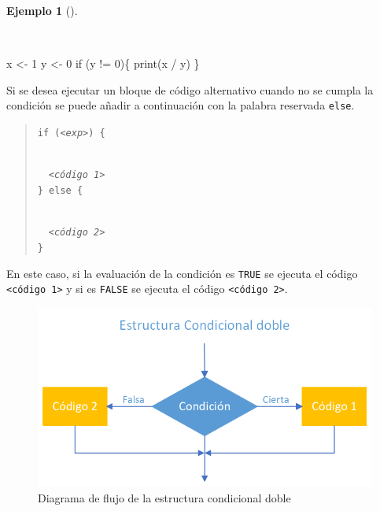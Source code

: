 \documentclass[
  a4paper,
]{scrreport}
\newenvironment{Shaded}{\begin{snugshade}}{\end{snugshade}}
\newcommand{\ControlFlowTok}[1]{\textcolor[rgb]{0.00,0.23,0.31}{#1}}
\newcommand{\DecValTok}[1]{\textcolor[rgb]{0.68,0.00,0.00}{#1}}
\newcommand{\FunctionTok}[1]{\textcolor[rgb]{0.28,0.35,0.67}{#1}}
\newcommand{\NormalTok}[1]{\textcolor[rgb]{0.00,0.23,0.31}{#1}}
\newcommand{\OtherTok}[1]{\textcolor[rgb]{0.00,0.23,0.31}{#1}}
\newcommand{\SpecialCharTok}[1]{\textcolor[rgb]{0.37,0.37,0.37}{#1}}
\theoremstyle{definition}
\theoremstyle{definition}
\newtheorem{example}{Ejemplo}[chapter]
\theoremstyle{remark}
\begin{document}
\begin{example}[]\protect\hypertarget{exm-condicional-simple}{}\label{exm-condicional-simple}

~

\begin{Shaded}
\begin{Highlighting}[]
\NormalTok{x }\OtherTok{\textless{}{-}} \DecValTok{1}
\NormalTok{y }\OtherTok{\textless{}{-}} \DecValTok{0}
\ControlFlowTok{if}\NormalTok{ (y }\SpecialCharTok{!=} \DecValTok{0}\NormalTok{)\{}
  \FunctionTok{print}\NormalTok{(x }\SpecialCharTok{/}\NormalTok{ y)}
\NormalTok{\}}
\end{Highlighting}
\end{Shaded}

\end{example}

Si se desea ejecutar un bloque de código alternativo cuando no se cumpla
la condición se puede añadir a continuación con la palabra reservada
\texttt{else}.

\begin{quote}
\texttt{if\ (}\emph{\texttt{\textless{}exp\textgreater{}}}\texttt{)\ \{}\strut \\
  \emph{\texttt{\textless{}código\ 1\textgreater{}}}\\
\texttt{\}\ else\ \{}\strut \\
  \emph{\texttt{\textless{}código\ 2\textgreater{}}}\\
\texttt{\}}
\end{quote}

En este caso, si la evaluación de la condición es \texttt{TRUE} se
ejecuta el código \texttt{\textless{}código\ 1\textgreater{}} y si es
\texttt{FALSE} se ejecuta el código
\texttt{\textless{}código\ 2\textgreater{}}.

\begin{figure}

{\centering \includegraphics{img/04-estructuras-control/condicional-doble.png}

}

\caption{Diagrama de flujo de la estructura condicional doble}

\end{figure}
\end{document}
